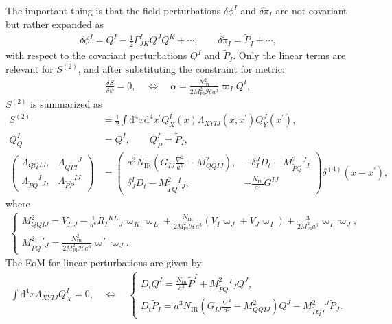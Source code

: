 \documentclass[aps, prd
, preprint
, nofootinbib 
, notitlepage
, longbibliography
]{revtex4-1}
\newcommand{\dd}{\mathrm{d}}
\newcommand{\Mpl}{M_\text{Pl}}
\newcommand{\IR}{\text{IR}}
\newcommand{\dps}{\displaystyle}
\newcommand{\calH}{\mathcal{H}}
\newcommand{\bae}[1]{\begin{align} #1 \end{align}}
\newcommand{\bce}[1]{\begin{cases} #1 \end{cases}}
\newcommand{\bpme}[1]{\begin{pmatrix} #1 \end{pmatrix}}
\begin{document}
The important thing is that the field perturbations $\delta\phi^I$ and $\delta\tilde{\pi}_I$ are not covariant but rather expanded as~\cite{Gong:2011uw}
\bae{
    \delta\phi^I=Q^I-\frac{1}{2}\Gamma^I_{JK}Q^JQ^K+\cdots, \qquad \delta\tilde{\pi}_I=\tilde{P}_I+\cdots,
}
with respect to the covariant perturbations $Q^I$ and $\tilde{P}_I$.
Only the linear terms are relevant for $S^{(2)}$, and after substituting the constraint for metric:
\bae{
    \frac{\delta S}{\delta\psi}=0, \quad \Leftrightarrow \quad \alpha=\frac{N_\IR^2}{2\Mpl^2\calH a^3}\varpi_IQ^I,
}
$S^{(2)}$ is summarized as
\bae{
    S^{(2)}&=\frac{1}{2}\int\dd^4x\dd^4x^\prime Q_X^I(x)\Lambda_{XYIJ}(x,x^\prime)Q^J_Y(x^\prime), \\
    Q^I_Q&=Q^I, \qquad Q^I_{\tilde{P}}=\tilde{P}_I, \\
    \bpme{
        \Lambda_{QQIJ}, & \Lambda_{Q\tilde{P}I}{}^J \\
        \Lambda_{\tilde{P}Q}{}^I{}_J, & \Lambda_{\tilde{P}\tilde{P}}{}^{IJ}
    }&=\bpme{
        a^3N_\IR\left(G_{IJ}\frac{\nabla^2}{a^2}-M^2_{QQIJ}\right), & -\delta^J_ID_t-M^2_{\tilde{P}Q}{}^J{}_I \\
        \delta^I_JD_t-M^2_{\tilde{P}Q}{}^I{}_J, & -\frac{N_\IR}{a^3}G^{IJ}
    }\delta^{(4)}(x-x^\prime),
}
where
\bae{
    \bce{
        \dps
        M^2_{QQIJ}=V_{I;J}-\frac{1}{a^6}R_I{}^{KL}{}_J\varpi_K\varpi_L+\frac{N_\IR}{2\Mpl^2\calH a^3}(V_I\varpi_J+V_J\varpi_I)+\frac{3}{2\Mpl^2a^6}\varpi_I\varpi_J, \\
        \dps
        M^2_{\tilde{P}Q}{}^I{}_J=\frac{N_\IR^2}{2\Mpl^2\calH a^6}\varpi^I\varpi_J.
    }
}
The EoM for linear perturbations are given by
\bae{
    \int\dd^4x\Lambda_{XYIJ}Q^I_X=0, \quad \Leftrightarrow \quad \bce{
        \dps
        D_tQ^I=\frac{N_\IR}{a^3}\tilde{P}^I+M^2_{\tilde{P}Q}{}^I{}_JQ^J, \\
        \dps
        D_t\tilde{P}_I=a^3N_\IR\left(G_{IJ}\frac{\nabla^2}{a^2}-M^2_{QQIJ}\right)Q^J-M^2_{\tilde{P}{Q}I}{}^J\tilde{P}_J.
    }
}
\end{document}
